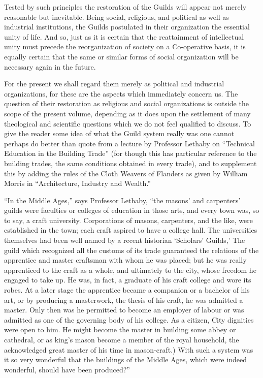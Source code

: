 \documentclass{book}
\begin{document}
Tested by such principles the restoration of the Guilds will appear not merely reasonable but inevitable. Being social, religious, and political as well as industrial institutions, the Guilds postulated in their organization the essential unity of life. And so, just as it is certain that the reattainment of intellectual unity must precede the reorganization of society on a Co-operative basis, it is equally certain that the same or similar forms of social organization will be necessary again in the future.

For the present we shall regard them merely as political and industrial organizations, for these are the aspects which immediately concern us. The question of their restoration as religious and social organizations is outside the scope of the present volume, depending as it does upon the settlement of many theological and scientific questions which we do not feel qualified to discuss. To give the reader some idea of what the Guild system really was one cannot perhaps do better than quote from a lecture by Professor Lethaby on “Technical Education in the Building Trade” (for though this has particular reference to the building trades, the same conditions obtained in every trade), and to supplement this by adding the rules of the Cloth Weavers of Flanders as given by William Morris in “Architecture, Industry and Wealth.”

“In the Middle Ages,” says Professor Lethaby, “the masons’ and carpenters’ guilds were faculties or colleges of education in those arts, and every town was, so to say, a craft university. Corporations of masons, carpenters, and the like, were established in the town; each craft aspired to have a college hall. The universities themselves had been well named by a recent historian ‘Scholars’ Guilds,’ The guild which recognized all the customs of its trade guaranteed the relations of the apprentice and master craftsman with whom he was placed; but he was really apprenticed to the craft as a whole, and ultimately to the city, whose freedom he engaged to take up. He was, in fact, a graduate of his craft college and wore its robes. At a later stage the apprentice became a companion or a bachelor of his art, or by producing a masterwork, the thesis of his craft, he was admitted a master. Only then was he permitted to become an employer of labour or was admitted as one of the governing body of his college. As a citizen, City dignities were open to him. He might become the master in building some abbey or cathedral, or as king’s mason become a member of the royal household, the acknowledged great master of his time in mason-craft.) With such a system was it so very wonderful that the buildings of the Middle Ages, which were indeed wonderful, should have been produced?”
\end{document}
